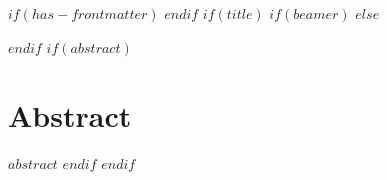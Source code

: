 $if(has-frontmatter)$
\frontmatter
$endif$
$if(title)$
$if(beamer)$
\frame{\titlepage}
$else$
\begin{singlespace}
    \maketitle
\end{singlespace}
$endif$
$if(abstract)$
\section*{Abstract}
$abstract$
$endif$
$endif$
\thispagestyle{plain}

